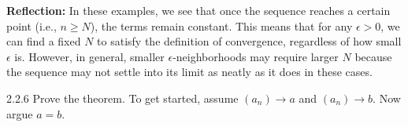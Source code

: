 {    \textbf{Reflection:} In these examples, we see that once the sequence reaches a certain point (i.e., \(n \geq N\)), the terms remain constant. This means that for any \(\epsilon > 0\), we can find a fixed \(N\) to satisfy the definition of convergence, regardless of how small \(\epsilon\) is. However, in general, smaller \(\epsilon\)-neighborhoods may require larger \(N\) because the sequence may not settle into its limit as neatly as it does in these cases.
}


\begin{exercise}
    {2.2.6} Prove the  theorem. To get started, assume \((a_{n}) \rightarrow a \) and \((a_{n}) \rightarrow b\). Now argue \(a = b\).
\end{exercise}


